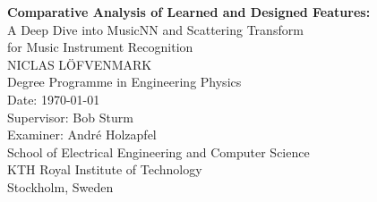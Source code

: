 \begin{titlepage}
  \centering
  \vspace*{2cm}

  {\LARGE\textbf{Comparative Analysis of Learned and Designed Features:}}\\[1em]
  {\Large A Deep Dive into MusicNN and Scattering Transform\\
  for Music Instrument Recognition}\\[3cm]

  {\large NICLAS L\"{O}FVENMARK}\\[1.5cm]

  {\normalsize Degree Programme in Engineering Physics}\\[0.5cm]
  {\normalsize Date: \today}\\[2cm]

  {\normalsize Supervisor: Bob Sturm}\\
  {\normalsize Examiner: Andr\'{e} Holzapfel}\\[1.5cm]

  {\normalsize School of Electrical Engineering and Computer Science}\\
  {\normalsize KTH Royal Institute of Technology}\\
  {\normalsize Stockholm, Sweden}

  \vspace*{\fill}
\end{titlepage}
